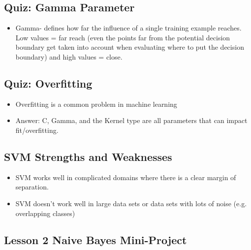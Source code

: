 \documentclass[12pt]{report}
\begin{document}
\subsection{Quiz: Gamma Parameter}

\begin{itemize}

\item Gamma- defines how far the influence of a single training example reaches. Low values = far reach (even the points far from the potential decision boundary get taken into account when evaluating where to put the decision boundary) and high values = close. 

\end{itemize}

\subsection{Quiz: Overfitting}

\begin{itemize}

\item Overfitting is a common problem in machine learning

\item Answer: C, Gamma, and the Kernel type are all parameters that can impact fit/overfitting.

\end{itemize}

\subsection{SVM Strengths and Weaknesses}

\begin{itemize}

\item SVM works well in complicated domains where there is a clear margin of separation.

\item SVM doesn't work well in large data sets or data sets with lots of noise (e.g. overlapping classes)

\end{itemize}

\subsection{Lesson 2 Naive Bayes Mini-Project}
\end{document}

